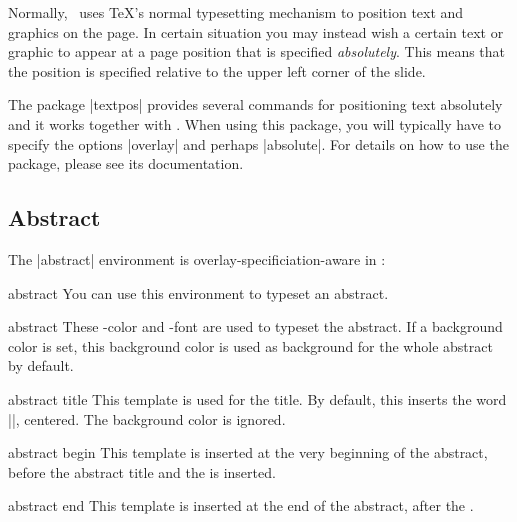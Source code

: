 Normally, \beamer\ uses \TeX's normal typesetting mechanism to
position text and graphics on the page. In certain situation you may
instead wish a certain text or graphic to appear at a
page position that is specified \emph{absolutely}. This means that the
position is specified relative to the upper left corner of the slide.

The package |textpos| provides several commands for positioning text
absolutely and it works together with \beamer. When using this
package, you will typically have to specify the options |overlay| and
perhaps |absolute|. For details on how to use the package, please see
its documentation.



\subsection{Abstract}

The |abstract| environment is overlay-specificiation-aware in \beamer:


\begin{environment}{{abstract}}
  You can use this environment to typeset an abstract.

  \begin{element}{abstract}\no\yes\yes
    These \beamer-color and -font are used to typeset the abstract. If
    a background color is set, this background color is used as
    background for the whole abstract by default.
  \end{element}

  \begin{element}{abstract title}\yes\yes\yes
    This template is used for the title. By default, this inserts
    the word |\abstractname|, centered. The background color is ignored.
  \end{element}

  \begin{element}{abstract begin}\yes\no\no
    This template is inserted at the very beginning of the abstract,
    before the abstract title and the  is inserted.
  \end{element}

  \begin{element}{abstract end}\yes\no\no
    This template is inserted at the end of the abstract, after the
    .
  \end{element}
\end{environment}




